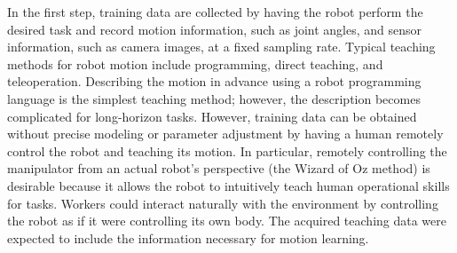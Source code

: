 In the first step, training data are collected by having the robot perform the desired task and record motion information, such as joint angles, and sensor information, such as camera images, at a fixed sampling rate. Typical teaching methods for robot motion include programming, direct teaching, and teleoperation. Describing the motion in advance using a robot programming language is the simplest teaching method; however, the description becomes complicated for long-horizon tasks. However, training data can be obtained without precise modeling or parameter adjustment by having a human remotely control the robot and teaching its motion. In particular, remotely controlling the manipulator from an actual robot's perspective (the Wizard of Oz method) is desirable because it allows the robot to intuitively teach human operational skills for tasks. Workers could interact naturally with the environment by controlling the robot as if it were controlling its own body. The acquired teaching data were expected to include the information necessary for motion learning.


